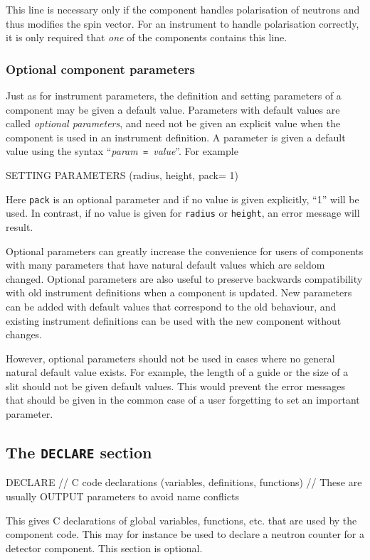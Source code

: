 This line is necessary only if the component handles polarisation of neutrons
and thus modifies the spin vector. For an instrument to handle polarisation
correctly, it is only required that {\em one} of the components contains this
line.

\subsubsection{Optional component parameters}

Just as for instrument parameters, the definition and setting parameters of a
component may be given a default value. Parameters with default values are
called \emph{optional parameters}, and need not be given an explicit value when
the component is used in an instrument definition. A parameter is given a
default value using the syntax ``\textit{param}\texttt{ = }\textit{value}''.
For example
\begin{mcstas}
SETTING PARAMETERS (radius, height, pack= 1)
\end{mcstas}
Here \verb+pack+ is an optional parameter and if no value is given
explicitly, ``1'' will be used. In contrast, if no value is
  given for \texttt{radius} or \texttt{height}, an error message will
  result.

  Optional parameters can greatly increase the convenience for users of
  components with many parameters that have natural default values which are
  seldom changed. Optional parameters are also useful to preserve backwards
  compatibility with old instrument definitions when a component is updated. New
  parameters can be added with default values that correspond to the old
  behaviour, and existing instrument definitions can be used with the new
  component without changes.

  However, optional parameters should not be used in cases where no general
  natural default value exists. For example, the length of a guide or the size
  of a slit should not be given default values. This would prevent the error
  messages that should be given in the common case of a user forgetting to set
  an important parameter.


\subsection{The \texttt{DECLARE} section}
\label{s:comp-declare}
\begin{mcstas}
DECLARE
// C code declarations (variables, definitions, functions)
// These are usually OUTPUT parameters to avoid name conflicts 
\end{mcstas}
 This gives C declarations of global variables,
functions, etc. that are used by the component code. This may for instance be
used to declare a neutron counter for a detector component. This section is
optional.


